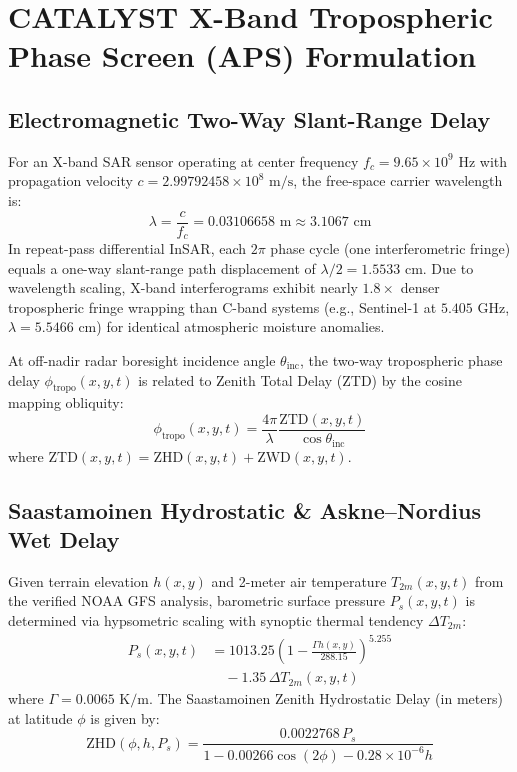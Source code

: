 \documentclass[10pt,twocolumn,letterpaper]{article}
\begin{document}
\section{CATALYST X-Band Tropospheric Phase Screen (APS) Formulation}

\subsection{Electromagnetic Two-Way Slant-Range Delay}
For an X-band SAR sensor operating at center frequency $f_c = 9.65 \times 10^9\text{ Hz}$ with propagation velocity $c = 2.99792458 \times 10^8\text{ m/s}$, the free-space carrier wavelength is:
\begin{equation}
    \lambda = \frac{c}{f_c} = 0.03106658\text{ m} \approx 3.1067\text{ cm}
\end{equation}
In repeat-pass differential InSAR, each $2\pi$ phase cycle (one interferometric fringe) equals a one-way slant-range path displacement of $\lambda/2 = 1.5533\text{ cm}$. Due to wavelength scaling, X-band interferograms exhibit nearly $1.8\times$ denser tropospheric fringe wrapping than C-band systems (e.g., Sentinel-1 at $5.405\text{ GHz}$, $\lambda = 5.5466\text{ cm}$) for identical atmospheric moisture anomalies.

At off-nadir radar boresight incidence angle $\theta_{\text{inc}}$, the two-way tropospheric phase delay $\phi_{\text{tropo}}(x,y,t)$ is related to Zenith Total Delay ($\text{ZTD}$) by the cosine mapping obliquity:
\begin{equation}
    \phi_{\text{tropo}}(x,y,t) = \frac{4\pi}{\lambda} \frac{\text{ZTD}(x,y,t)}{\cos\theta_{\text{inc}}}
    \label{eq:phi_tropo}
\end{equation}
where $\text{ZTD}(x,y,t) = \text{ZHD}(x,y,t) + \text{ZWD}(x,y,t)$.

\subsection{Saastamoinen Hydrostatic \& Askne--Nordius Wet Delay}
Given terrain elevation $h(x,y)$ and 2-meter air temperature $T_{2m}(x,y,t)$ from the verified NOAA GFS analysis, barometric surface pressure $P_s(x,y,t)$ is determined via hypsometric scaling with synoptic thermal tendency $\Delta T_{2m}$:
\begin{equation}
\begin{split}
    P_s(x,y,t) &= 1013.25 \left(1 - \frac{\Gamma h(x,y)}{288.15}\right)^{5.255} \\
    &\quad - 1.35\,\Delta T_{2m}(x,y,t)
\end{split}
\end{equation}
where $\Gamma = 0.0065\text{ K/m}$. The Saastamoinen Zenith Hydrostatic Delay (in meters) at latitude $\phi$ is given by:
\begin{equation}
    \text{ZHD}(\phi, h, P_s) = \frac{0.0022768\,P_s}{1 - 0.00266\cos(2\phi) - 0.28\times 10^{-6} h}
    \label{eq:saastamoinen}
\end{equation}
\end{document}
